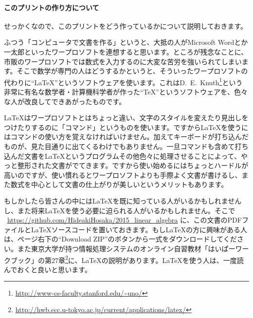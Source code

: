 

\paragraph{このプリントの作り方について}

せっかくなので、このプリントをどう作っているかについて説明しておきます。

ふつう「コンピュータで文書を作る」というと、大抵の人がMicrosoft Wordとか一太郎といったワープロソフトを連想すると思います。ところが残念なことに、市販のワープロソフトでは数式を入力するのに大変な苦労を強いられてしまいます。そこで数学が専門の人はどうするかというと、そういったワープロソフトの代わりに``\LaTeX''というソフトウェアを使います。これはD.~E.~Knuth\footnote{\href{http://www-cs-faculty.stanford.edu/~uno/}{\url{http://www-cs-faculty.stanford.edu/~uno/}}}という非常に有名な数学者・計算機科学者が作った``\TeX''というソフトウェアを、色々な人が改良してできあがったものです。

\LaTeX はワープロソフトとはちょっと違い、文字のスタイルを変えたり見出しをつけたりするのに「コマンド」というものを使います。ですから\LaTeX を使うにはコマンドの使い方を覚えなければいけません。加えてキーボードが打ち込んだものが、見た目通りに出てくるわけでもありません。一旦コマンドも含めて打ち込んだ文書を\LaTeX というプログラムその他色々に処理させることによって、やっと整形された文書がでてきます。ですから使い始めるにはちょっとハードルが高いのですが、使い慣れるとワープロソフトよりも手際よく文書が書けるし、また数式を中心として文書の仕上がりが美しいというメリットもあります。

もしかしたら皆さんの中には\LaTeX を既に知っている人がいるかもしれませんし、また将来\LaTeX を使う必要に迫られる人がいるかもしれません。そこで
\ \url{https://github.com/HideakiHosaka/2015_linear_algebra}
に、この文書のPDFファイルと\LaTeX ソースコードを置いておきます。もし\LaTeX の方に興味がある人は、ページ右下の``Download ZIP''のボタンから一式をダウンロードしてください。また東京大学が持つ情報処理システムのオンライン自習教材「はいぱーワークブック」の第27章\footnote{\url{http://hwb.ecc.u-tokyo.ac.jp/current/applications/latex/}}に、\LaTeX の説明があります。\LaTeX を使う人は、一度読んでおくと良いと思います。

